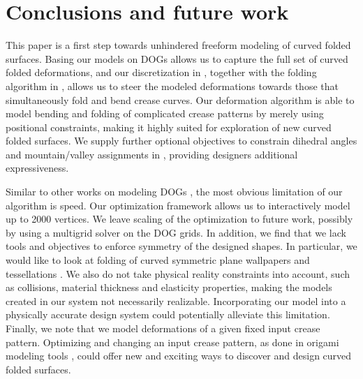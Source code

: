 \section{Conclusions and future work}
This paper is a first step towards unhindered freeform modeling of curved folded surfaces. Basing our models on DOGs \cite{rabi18} allows us to capture the full set of curved folded deformations, and our discretization in , together with the folding algorithm in , allows us to steer the modeled deformations towards those that simultaneously fold and bend crease curves. Our deformation algorithm is able to model bending and folding of complicated crease patterns by merely using positional constraints, making it highly suited for exploration of new curved folded surfaces. We supply further optional objectives to constrain dihedral angles and mountain/valley assignments in , providing designers additional expressiveness. 

Similar to other works on modeling DOGs , the most obvious limitation of our algorithm is speed. Our optimization framework allows us to interactively model up to 2000 vertices. We leave scaling of the optimization to future work, possibly by using a multigrid solver on the DOG grids. In addition, we find that we lack tools and objectives to enforce symmetry of the designed shapes. In particular, we would like to look at folding of curved symmetric plane wallpapers and tessellations \cite{demaine_lens,mundilova2019mathematical}. We also do not take physical reality constraints into account, such as collisions, material thickness and elasticity properties, making the models created in our system not necessarily realizable. Incorporating our model into a physically accurate design system could potentially alleviate this limitation. Finally, we note that we model deformations of a given fixed input crease pattern. Optimizing and changing an input crease pattern, as done in origami modeling tools \cite{tachi2010freeform}, could offer new and exciting ways to discover and design curved folded surfaces. 